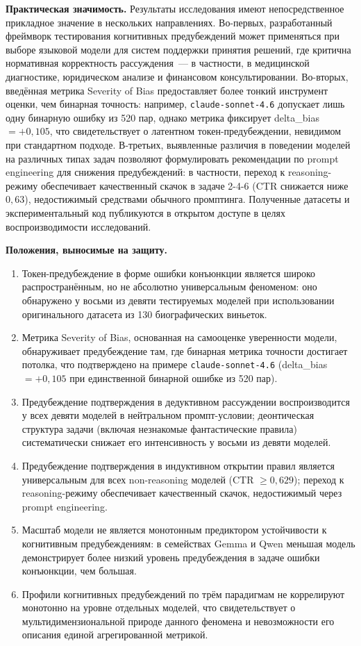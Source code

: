 \textbf{Практическая значимость.}
Результаты исследования имеют непосредственное прикладное значение в нескольких направлениях. Во-первых, разработанный фреймворк тестирования когнитивных предубеждений может применяться при выборе языковой модели для систем поддержки принятия решений, где критична нормативная корректность рассуждения~--- в частности, в медицинской диагностике, юридическом анализе и финансовом консультировании. Во-вторых, введённая метрика Severity of Bias предоставляет более тонкий инструмент оценки, чем бинарная точность: например, \texttt{claude-sonnet-4.6} допускает лишь одну бинарную ошибку из 520 пар, однако метрика фиксирует delta\_bias $= +0{,}105$, что свидетельствует о латентном токен-предубеждении, невидимом при стандартном подходе. В-третьих, выявленные различия в поведении моделей на различных типах задач позволяют формулировать рекомендации по prompt engineering для снижения предубеждений: в частности, переход к reasoning-режиму обеспечивает качественный скачок в задаче 2-4-6 (CTR снижается ниже $0{,}63$), недостижимый средствами обычного промптинга. Полученные датасеты и экспериментальный код публикуются в открытом доступе в целях воспроизводимости исследований.

\textbf{Положения, выносимые на защиту.}
\begin{enumerate}
  \item Токен-предубеждение в форме ошибки конъюнкции является широко распространённым, но не абсолютно универсальным феноменом: оно обнаружено у восьми из девяти тестируемых моделей при использовании оригинального датасета из 130 биографических виньеток.
  \item Метрика Severity of Bias, основанная на самооценке уверенности модели, обнаруживает предубеждение там, где бинарная метрика точности достигает потолка, что подтверждено на примере \texttt{claude-sonnet-4.6} (delta\_bias $= +0{,}105$ при единственной бинарной ошибке из 520 пар).
  \item Предубеждение подтверждения в дедуктивном рассуждении воспроизводится у всех девяти моделей в нейтральном промпт-условии; деонтическая структура задачи (включая незнакомые фантастические правила) систематически снижает его интенсивность у восьми из девяти моделей.
  \item Предубеждение подтверждения в индуктивном открытии правил является универсальным для всех non-reasoning моделей (CTR $\geq 0{,}629$); переход к reasoning-режиму обеспечивает качественный скачок, недостижимый через prompt engineering.
  \item Масштаб модели не является монотонным предиктором устойчивости к когнитивным предубеждениям: в семействах Gemma и Qwen меньшая модель демонстрирует более низкий уровень предубеждения в задаче ошибки конъюнкции, чем большая.
  \item Профили когнитивных предубеждений по трём парадигмам не коррелируют монотонно на уровне отдельных моделей, что свидетельствует о мультидимензиональной природе данного феномена и невозможности его описания единой агрегированной метрикой.
\end{enumerate}


